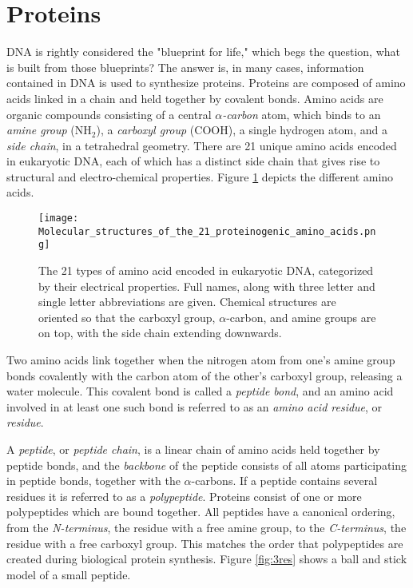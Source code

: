 \section{Proteins}

DNA is rightly considered the "blueprint for life," which begs the question, what is built from those blueprints?
The answer is, in many cases, information contained in DNA is used to synthesize proteins.
Proteins are composed of amino acids linked in a chain and held together by covalent bonds.
Amino acids are organic compounds consisting of a central \emph{$\alpha$-carbon} atom, which binds to an \emph{amine group} ($\mathrm{NH_2}$), a \emph{carboxyl group} ($\mathrm{COOH}$), a single hydrogen atom, and a \emph{side chain}, in a tetrahedral geometry.
There are 21 unique amino acids encoded in eukaryotic DNA, each of which has a distinct side chain that gives rise to structural and electro-chemical properties.
Figure \ref{fig:aminoacids} depicts the different amino acids.

\begin{figure}
	\centering
	\texttt{[image: Molecular\_structures\_of\_the\_21\_proteinogenic\_amino\_acids.png]}
	\caption{The 21 types of amino acid encoded in eukaryotic DNA, categorized by their electrical properties. Full names, along with three letter and single letter abbreviations are given. Chemical structures are oriented so that the carboxyl group, $\alpha$-carbon, and amine groups are on top, with the side chain extending downwards.}
	\label{fig:aminoacids}
\end{figure}

Two amino acids link together when the nitrogen atom from one's amine group bonds covalently with the carbon atom of the other's carboxyl group, releasing a water molecule.
This covalent bond is called a \emph{peptide bond}, and an amino acid involved in at least one such bond is referred to as an \emph{amino acid residue}, or \emph{residue}.

A \emph{peptide}, or \emph{peptide chain}, is a linear chain of amino acids held together by peptide bonds, and the \emph{backbone} of the peptide consists of all atoms participating in peptide bonds, together with the $\alpha$-carbons.
If a peptide contains several residues it is referred to as a \emph{polypeptide}.
Proteins consist of one or more polypeptides which are bound together.
All peptides have a canonical ordering, from the \emph{N-terminus}, the residue with a free amine group, to the \emph{C-terminus}, the residue with a free carboxyl group.
This matches the order that polypeptides are created during biological protein synthesis.
Figure \ref{fig:3res} shows a ball and stick model of a small peptide.

